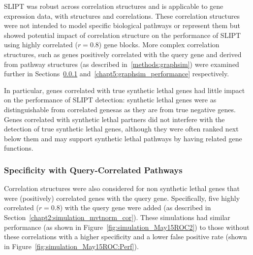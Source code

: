 \gls{SLIPT} was robust across correlation structures and is applicable to gene expression data, with  structures and correlations. These correlation structures were not intended to model specific biological pathways or represent them but showed potential impact of correlation structure on the performance of \gls{SLIPT} using highly correlated ($r = 0.8$) gene blocks. More complex correlation structures, such as genes positively correlated with the query gene and derived from pathway  structures (as described in~\ref{methods:graphsim}) were examined further in Sections~\ref{chapt2:simulation_mvtnorm_query_cor} and~\ref{chapt5:graphsim_performance} respectively.

In particular, genes correlated with true \gls{synthetic lethal} genes had little impact on the performance of \gls{SLIPT} detection: \gls{synthetic lethal} genes were as distinguishable from correlated genesas as they are from true negative genes. Genes correlated with \gls{synthetic lethal} partners did not interfere with the detection of true \gls{synthetic lethal} genes, although they were often ranked next below them and may support \gls{synthetic lethal} pathways by having related gene functions.


\subsubsection{Specificity with Query-Correlated Pathways}  \label{chapt2:simulation_mvtnorm_query_cor}

Correlation structures were also considered for non synthetic lethal genes that were (positively) correlated genes with the query gene. Specifically, five highly correlated ($r = 0.8$) with the query gene were added (as described in Section~\ref{chapt2:simulation_mvtnorm_cor}). These simulations had similar performance (as shown in Figure~\ref{fig:simulation_May15ROC2}) to those without these correlations with a higher specificity and a lower false positive rate (shown in Figure~\ref{fig:simulation_May15ROC:Perf}).


